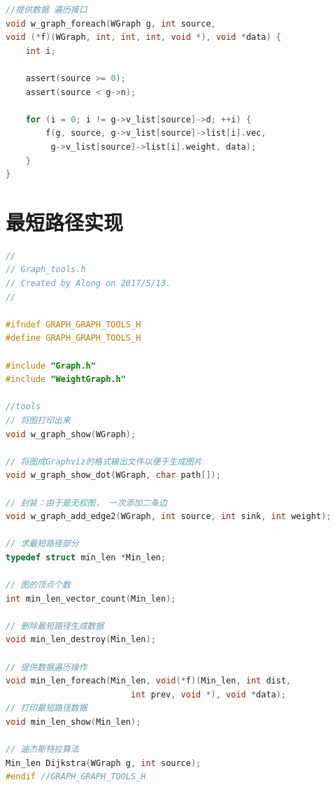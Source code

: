 \documentclass[a4paper,10pt]{ctexart}
\begin{document}
\begin{lstlisting}[language={C}]
//提供数据 遍历接口
void w_graph_foreach(WGraph g, int source,
void (*f)(WGraph, int, int, int, void *), void *data) {
    int i;

    assert(source >= 0);
    assert(source < g->n);

    for (i = 0; i != g->v_list[source]->d; ++i) {
        f(g, source, g->v_list[source]->list[i].vec,
         g->v_list[source]->list[i].weight, data);
    }
}
\end{lstlisting}

\section{最短路径实现}
\begin{lstlisting}[language={C}]
//
// Graph_tools.h
// Created by Along on 2017/5/13.
//

#ifndef GRAPH_GRAPH_TOOLS_H
#define GRAPH_GRAPH_TOOLS_H

#include "Graph.h"
#include "WeightGraph.h"

//tools
// 将图打印出来
void w_graph_show(WGraph);

// 将图成Graphviz的格式输出文件以便于生成图片
void w_graph_show_dot(WGraph, char path[]);

// 封装：由于是无权图， 一次添加二条边
void w_graph_add_edge2(WGraph, int source, int sink, int weight);

// 求最短路径部分
typedef struct min_len *Min_len;

// 图的顶点个数
int min_len_vector_count(Min_len);

// 删除最短路径生成数据
void min_len_destroy(Min_len);

// 提供数据遍历操作
void min_len_foreach(Min_len, void(*f)(Min_len, int dist,
                         int prev, void *), void *data);
// 打印最短路径数据
void min_len_show(Min_len);

// 迪杰斯特拉算法
Min_len Dijkstra(WGraph g, int source);
#endif //GRAPH_GRAPH_TOOLS_H
\end{lstlisting}
\end{document}
